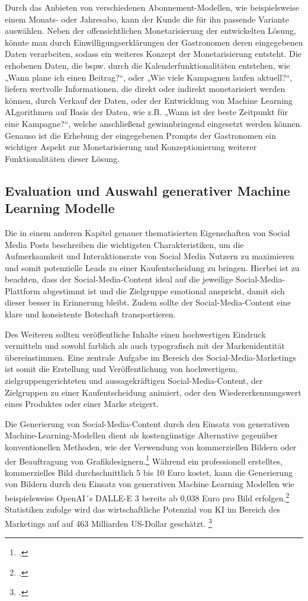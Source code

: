 Durch das Anbieten von verschiedenen Abonnement-Modellen, wie beispielsweise einem Monats- oder Jahresabo, kann der Kunde die für ihn passende Variante auswählen.
Neben der offensichtlichen Monetarisierung der entwickelten Lösung, könnte man durch Einwilligungserklärungen der Gastronomen deren eingegebenen Daten verarbeiten, sodass ein weiteres Konzept der Monetarisierung entsteht.
Die erhobenen Daten, die bspw. durch die Kalenderfunktionalitäten entstehen, wie „Wann plane ich einen Beitrag?“, oder „Wie viele Kampagnen laufen aktuell?“, liefern wertvolle Informationen, die direkt oder indirekt monetarisiert werden können, durch Verkauf der Daten, oder der Entwicklung von Machine Learning ALgorithmen auf Basis der Daten, wie z.B. „Wann ist der beste Zeitpunkt für eine Kampagne?“, welche anschließend gewinnbringend eingesetzt werden können.
Genauso ist die Erhebung der eingegebenen Prompts der Gastronomen ein wichtiger Aspekt zur Monetarisierung und Konzeptionierung weiterer Funktionalitäten dieser Lösung.

\subsection{Evaluation und Auswahl generativer Machine Learning Modelle} %
Die in einem anderen Kapitel genauer thematisierten Eigenschaften von Social Media Posts beschreiben die wichtigsten Charakteristiken, um die Aufmerksamkeit und Interaktionsrate von Social Media Nutzern zu maximieren und somit potenzielle Leads zu einer Kaufentscheidung zu bringen.
Hierbei ist zu beachten, dass der Social-Media-Content ideal auf die jeweilige Social-Media-Plattform abgestimmt ist und die Zielgruppe emotional anspricht, damit sich dieser besser in Erinnerung bleibt.
Zudem sollte der Social-Media-Content eine klare und konsistente Botschaft transportieren.

Des Weiteren sollten veröffentliche Inhalte einen hochwertigen Eindruck vermitteln und sowohl farblich als auch typografisch mit der Markenidentität übereinstimmen.
Eine zentrale Aufgabe im Bereich des Social-Media-Marketings ist somit die Erstellung und Veröffentlichung von hochwertigem, zielgruppengerichteten und aussagekräftigen Social-Media-Content, der Zielgruppen zu einer Kaufentscheidung animiert, oder den Wiedererkennungswert eines Produktes oder einer Marke steigert.

Die Generierung von Social-Media-Content durch den Einsatz von generativen Machine-Learning-Modellen dient als kostengünstige Alternative gegenüber konventionellen Methoden, wie der Verwendung von kommerziellen Bildern oder der Beauftragung von Grafikdesignern.\footcite[1-2]{hartmann2024power}
Während ein professionell erstelltes, kommerzielles Bild durchschnittlich 5 bis 10 Euro kostet, kann die Generierung von Bildern durch den Einsatz von generativen Machine Learning Modellen wie beispielsweise OpenAI´s DALLE-E 3 bereits ab 0,038 Euro pro Bild erfolgen.\footcite{betker2023improving}
Statistiken zufolge wird das wirtschaftliche Potenzial von KI im Bereich des Marketings auf auf 463 Milliarden US-Dollar geschätzt. \footcite{chui2023economic}

